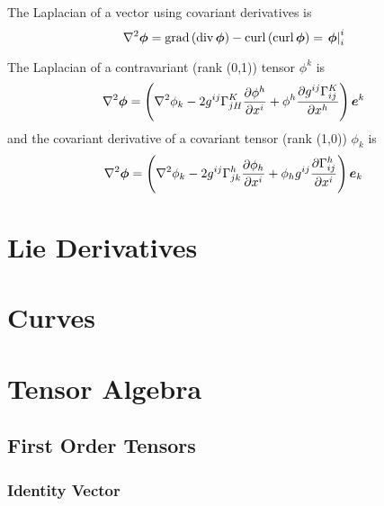 The Laplacian of a vector using covariant derivatives is
\begin{equation}
  \laplacian{}{\vectr{\phi}}=\gradop\pbrac{\divop\vectr{\phi}}-\curlop \pbrac{\curlop\vectr{\phi}}=\mixedderiv{\vectr{\phi}}{i}{i}
\end{equation}

The Laplacian of a contravariant (rank (0,1)) tensor $\phi^{k}$ is
\begin{equation}
  \laplacian{}{\vectr{\phi}}=\pbrac{\laplacian{}{\phi_{k}}-2g^{ij}\christoffel{K}{j}{H}\delby{\phi^{h}}{x^{i}}+\phi^{h}\delby{g^{ij}\christoffel{K}{i}{j}}{x^{h}}}\vectr{e}^{k}
\end{equation}
and the covariant derivative of a covariant tensor  (rank (1,0)) $\phi_{k}$ is
\begin{equation}
  \laplacian{}{\vectr{\phi}}=\pbrac{\laplacian{}{\phi_{k}}-2g^{ij}\christoffel{h}{j}{k}\delby{\phi_{h}}{x^{i}}+\phi_{h}g^{ij}\delby{\christoffel{h}{i}{j}}{x^{i}}}\vectr{e}_{k}
\end{equation}

\section{Lie Derivatives}


\section{Curves}


\section{Tensor Algebra}
\label{sec:TensorAlgebra}

\subsection{First Order Tensors}
\label{subsec:TensorAlgebraFirstOrder}

\subsubsection{Identity Vector}
\label{subsubsec:IdentityTensorFirstOrder}

